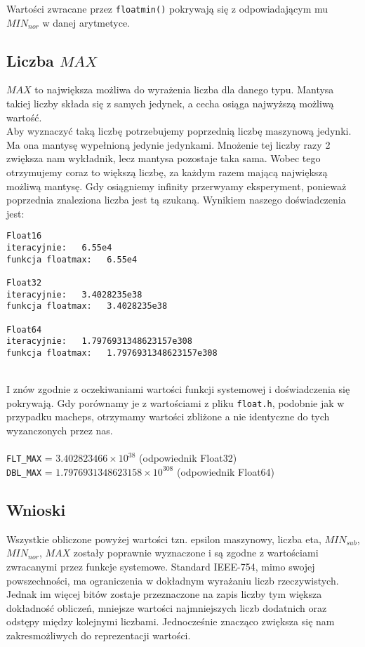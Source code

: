 \documentclass{article}
\begin{document}
\noindent Wartości zwracane przez \texttt{floatmin()} pokrywają się z odpowiadającym mu $MIN_{nor}$ w danej arytmetyce.\\

\subsection{Liczba $MAX$}
$MAX$ to największa możliwa do wyrażenia liczba dla danego typu. Mantysa takiej liczby składa się z samych jedynek, a cecha osiąga najwyższą możliwą wartość.\\
Aby wyznaczyć taką liczbę potrzebujemy poprzednią liczbę maszynową jedynki. Ma ona mantysę wypełnioną jedynie jedynkami. Mnożenie tej liczby razy 2 zwiększa nam wykładnik, lecz mantysa pozostaje taka sama. Wobec tego otrzymujemy coraz to większą liczbę, za każdym razem mającą największą możliwą mantysę. Gdy osiągniemy infinity przerwyamy eksperyment, ponieważ poprzednia znaleziona liczba jest tą szukaną. Wynikiem naszego doświadczenia jest:
\begin{verbatim}
Float16
iteracyjnie:   6.55e4
funkcja floatmax:   6.55e4

Float32
iteracyjnie:   3.4028235e38
funkcja floatmax:   3.4028235e38

Float64
iteracyjnie:   1.7976931348623157e308
funkcja floatmax:   1.7976931348623157e308
\end{verbatim}

\noindent \\ I znów zgodnie z oczekiwaniami wartości funkcji systemowej i doświadczenia się pokrywają.
Gdy porównamy je z wartościami z pliku \texttt{float.h}, podobnie jak w przypadku macheps, otrzymamy wartości zbliżone a nie identyczne do tych wyzanczonych przez nas.\\\\
\texttt{FLT\_MAX} = $3.402823466 \times 10^{38}$ (odpowiednik Float32)\\
\texttt{DBL\_MAX} = $1.7976931348623158 \times 10^{308}$ (odpowiednik Float64)\\

\subsection{Wnioski}
Wszystkie obliczone powyżej wartości tzn. epsilon maszynowy, liczba eta, $MIN_{sub}$, $MIN_{nor}$, $MAX$ zostały poprawnie wyznaczone i są zgodne z wartościami zwracanymi przez funkcje systemowe. Standard IEEE-754, mimo swojej powszechności, ma ograniczenia w dokładnym wyrażaniu liczb rzeczywistych. Jednak im więcej bitów zostaje przeznaczone na zapis liczby tym większa dokładność obliczeń, mniejsze wartości najmniejszych liczb dodatnich oraz odstępy między kolejnymi liczbami. Jednocześnie znacząco zwiększa się nam zakresmożliwych do reprezentacji wartości.
\end{document}
